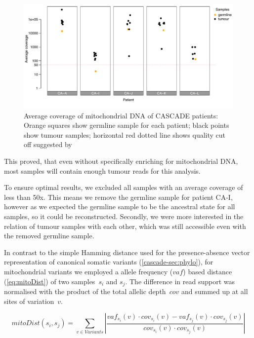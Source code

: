 \begin{figure}[!ht]
\centering
\includegraphics[width=.99\linewidth]{Figures/CASCADE/mito/mtCoverage}
\vspace{-1em}
\caption[Average coverage of mitochondrial DNA of CASCADE patients]{Average coverage of mitochondrial DNA of CASCADE patients: Orange squares show germline sample for each patient; black points show tumour samples; horizontal red dotted line shows quality cut off suggested by \protect\textcite{Ludwig2019}} \label{fig:mtCoverage}
\end{figure}

This proved, that even without specifically enriching for mitochondrial DNA, most samples will contain enough tumour reads for this analysis.

To ensure optimal results, we excluded all samples with an average coverage of less than 50x. This means we remove the germline sample for patient CA-I, however as we expected the germline sample to be the ancestral state for all samples, so it could be reconstructed. Secondly, we were more interested in the relation of tumour samples with each other, which was still accessible even with the removed germline sample.

In contrast to the simple Hamming distance used for the presence-absence vector representation of canonical somatic variants (\autoref{cascade-sec:phylo}), for mitochondrial variants we employed a allele frequency ($vaf$) based distance (\autoref{eq:mitoDist}) of two samples~$s_i$ and $s_j$. The difference in read support was normalised with the product of the total allelic depth~$cov$ and summed up at all sites of variation~$v$.

\begin{equation}
mitoDist(s_i,s_j) = \sum_{v \in Variants} \left| \frac{vaf_{s_i}(v) \cdot cov_{s_i}(v) - vaf_{s_j}(v) \cdot cov_{s_j}(v)}{cov_{s_i}(v) \cdot cov_{s_j}(v)} \right| \label{eq:mitoDist}
\end{equation}
\myequation[\ref{eq:mitoDist}]{Mitochondrial variants based distance function of two samples}

